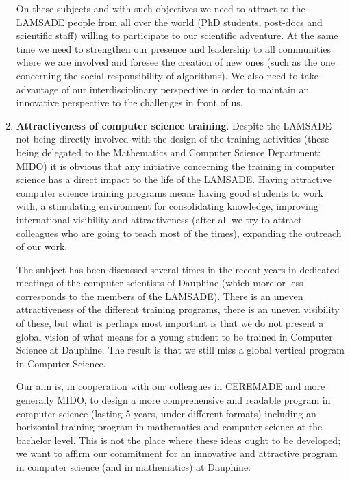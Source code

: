 \begin{enumerate}
      On these subjects and with such objectives we need to attract to the LAMSADE people from all over the world (PhD students, post-docs and scientific staff) willing to participate to our scientific adventure. At the same time we need to strengthen our presence and leadership to all communities where we are involved and foresee the creation of new ones (such as the one concerning the social responsibility of algorithms). We also need to take advantage of our interdisciplinary perspective in order to maintain an innovative perspective to the challenges in front of us.
  \item \textbf{Attractiveness of computer science training}. Despite the LAMSADE not being directly involved with the design of the training activities (these being delegated to the Mathematics and Computer Science Department: MIDO) it is obvious that any initiative concerning the training in computer science has a direct impact to the life of the LAMSADE. Having attractive computer science training programs means having good students to work with, a stimulating environment for consolidating knowledge, improving international visibility and attractiveness (after all we try to attract colleagues who are going to teach most of the times), expanding the outreach of our work.

      The subject has been discussed several times in the recent years in dedicated meetings of the computer scientists of Dauphine (which more or less corresponds to the members of the LAMSADE). There is an uneven attractiveness of the different training programs, there is an uneven visibility of these, but what is perhaps most important is that we do not present a global vision of what means for a young student to be trained in Computer Science at Dauphine. The result is that we still miss a global vertical program in Computer Science.

      Our aim is, in cooperation with our colleagues in CEREMADE and more generally MIDO, to design a more comprehensive and readable program in computer science (lasting 5 years, under different formats) including an horizontal training program in mathematics and computer science at the bachelor level. This is not the place where these ideas ought to be developed; we want to affirm our commitment for an innovative and attractive program in computer science (and in mathematics) at Dauphine.


\end{enumerate}

